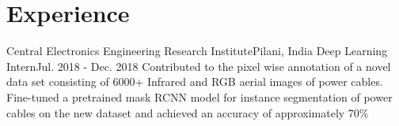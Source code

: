 \section{Experience}
  \resumeSubHeadingListStart
  
    \resumeSubheading
      {Central Electronics Engineering Research Institute}{Pilani, India}
      {Deep Learning Intern}{Jul. 2018 - Dec. 2018}
      \resumeItemListStart
          {Contributed to the pixel wise annotation of a novel data set consisting of 6000+ Infrared and RGB aerial images of power cables.}
          {Fine-tuned a pretrained mask RCNN model for instance segmentation of power cables on the new dataset and achieved an accuracy of approximately 70\%}
      \resumeItemListEnd

  \resumeSubHeadingListEnd
